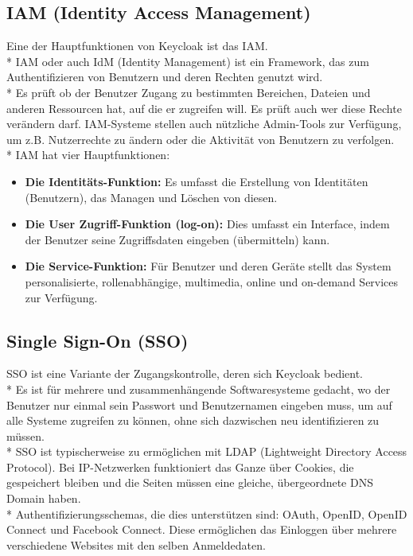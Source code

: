 \subsection{IAM (Identity Access Management)}
\label{sec:IAM}
Eine der Hauptfunktionen von Keycloak ist das IAM. \\*
IAM oder auch IdM (Identity Management) ist ein Framework, das zum Authentifizieren von Benutzern und deren Rechten genutzt wird. \\*
Es prüft ob der Benutzer Zugang zu bestimmten Bereichen, Dateien und anderen Ressourcen hat, auf die er zugreifen will. Es prüft auch wer diese Rechte verändern darf.
IAM-Systeme stellen auch nützliche Admin-Tools zur Verfügung, um z.B. Nutzerrechte zu ändern oder die Aktivität von Benutzern zu verfolgen. \cite{KeycloakMakeIT} \\*
IAM hat vier Hauptfunktionen:
\begin{itemize}
    \item \textbf{Die Identitäts-Funktion: }Es umfasst die Erstellung von Identitäten (Benutzern), das Managen und Löschen von diesen.  
    \item \textbf{Die User Zugriff-Funktion (log-on): } Dies umfasst ein Interface, indem der Benutzer seine Zugriffsdaten eingeben (übermitteln) kann.
    \item \textbf{Die Service-Funktion: } Für Benutzer und deren Geräte stellt das System personalisierte, rollenabhängige, multimedia, online und on-demand Services zur Verfügung. \cite{KeycloakMakeIT}
\end{itemize}

\subsection{Single Sign-On (SSO)}
\label{sec:SSO}
SSO ist eine Variante der Zugangskontrolle, deren sich Keycloak bedient. \\*
Es ist für mehrere und zusammenhängende Softwaresysteme gedacht, wo der Benutzer nur einmal sein Passwort und Benutzernamen eingeben muss, um auf alle Systeme zugreifen zu können,
ohne sich dazwischen neu identifizieren zu müssen.\\* SSO ist typischerweise zu ermöglichen mit LDAP (Lightweight Directory Access Protocol). Bei IP-Netzwerken funktioniert das Ganze über Cookies, die gespeichert bleiben 
und die Seiten müssen eine gleiche, übergeordnete DNS Domain haben.\\* 
Authentifizierungsschemas, die dies unterstützen sind: OAuth, OpenID, OpenID Connect und Facebook Connect. Diese ermöglichen das Einloggen über mehrere verschiedene Websites mit den selben Anmeldedaten.\cite{KeycloakMakeIT}
